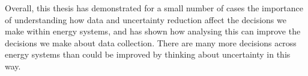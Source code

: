 Overall, this thesis has demonstrated for a small number of cases the importance of understanding how data and uncertainty reduction affect the decisions we make within energy systems, and has shown how analysing this can improve the decisions we make about data collection. There are many more decisions across energy systems than could be improved by thinking about uncertainty in this way.